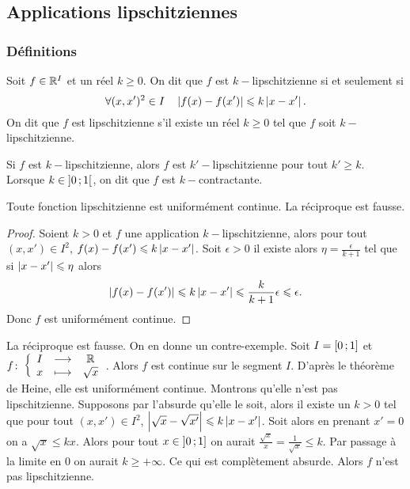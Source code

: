 \subsection{Applications lipschitziennes}

\subsubsection{Définitions}

\begin{defdef}
  Soit \(f \in \mathbb{R}^I\) et un réel \(k \geqslant 0\). On dit que \(f\) est \(k-\)lipschitzienne si et seulement si
  \begin{equation}
    \forall (x,x')^2 \in I \quad \left\lvert f(x)-f(x')\right\rvert \leqslant k \left\lvert x-x'\right\rvert.
  \end{equation}
  On dit que \(f\) est lipschitzienne s'il existe un réel \(k \geqslant 0\) tel que \(f\) soit \(k-\)lipschitzienne.
\end{defdef}
Si \(f\) est \(k-\)lipschitzienne, alors \(f\) est \(k'-\)lipschitzienne pour tout \(k' \geqslant k\). Lorsque \(k \in \left] 0 \, ;  1 \right[\), on dit que \(f\) est \(k-\)contractante.
%
\begin{theo}
  Toute fonction lipschitzienne est uniformément continue. La réciproque est fausse.
\end{theo}
\begin{proof}
  Soient \(k >0\) et \(f\) une application \(k-\)lipschitzienne, alors pour tout \((x,x') \in I^2\), \(f(x)-f(x') \leqslant k\left\lvert x-x'\right\rvert\). Soit \(\epsilon >0\) il existe alors \(\eta = \frac{\epsilon}{k+1}\) tel que si \(\left\lvert x-x'\right\rvert \leqslant \eta\) alors 
\begin{equation}
  \left\lvert f(x)-f(x')\right\rvert \leqslant k\left\lvert x-x'\right\rvert \leqslant \frac{k}{k+1} \epsilon \leqslant \epsilon.
\end{equation}
Donc \(f\) est uniformément continue.
\end{proof}
La réciproque est fausse. On en donne un contre-exemple. Soit \(I=\left[ 0 \, ;  1 \right]\) et \(f\colon \left\{\begin{array}{ccc} I & \longrightarrow &\mathbb{R}\\ x & \longmapsto & \sqrt{x} \end{array} \right.\). Alors \(f\) est continue sur le segment \(I\). D'après le théorème de Heine, elle est uniformément continue. Montrons qu'elle n'est pas lipschitzienne. Supposons par l'absurde qu'elle le soit, alors il existe un \(k >0\) tel que pour tout \((x,x') \in I^2\), \(\left\lvert\sqrt{x}-\sqrt{x'}\right\rvert \leqslant k\left\lvert x-x'\right\rvert\). Soit alors en prenant \(x'=0\) on a \(\sqrt{x} \leqslant k x\). Alors pour tout \(x \in \left] 0 \, ;  1 \right]\) on aurait \(\frac{\sqrt{x}}{x}=\frac{1}{\sqrt{x}} \leqslant k\). Par passage à la limite en \(0\) on aurait \(k \geqslant + \infty\). Ce qui est complètement absurde. Alors \(f\) n'est pas lipschitzienne.

